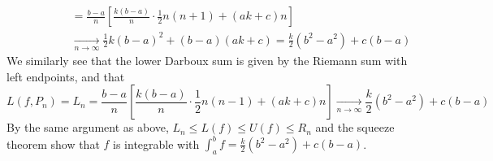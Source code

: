 \begin{examples}{}{}
\begin{enumerate}
	\begin{align*}
	\phantom{U(f,P_n)}&=\frac{b-a}n\left[\frac{k(b-a)}n\cdot \frac 12n(n+1)+(ak+c)n\right]\\
	&\xrightarrow[n\to\infty]{} \frac 12k(b-a)^2+(b-a)(ak+c)=\frac k2(b^2-a^2)+c(b-a)
	\end{align*}
	We similarly see that the lower Darboux sum is given by the Riemann sum with left endpoints, and that 
	\[L(f,P_n)=L_n= \frac{b-a}n\left[\frac{k(b-a)}n\cdot \frac 12n(n-1)+(ak+c)n\right] \xrightarrow[n\to\infty]{} \frac k2(b^2-a^2)+c(b-a)
	\]
	By the same argument as above, $L_n\le L(f)\le U(f)\le R_n$ and the squeeze theorem show that $f$ is integrable with $\int_a^bf=\frac k2(b^2-a^2)+c(b-a)$. 
\end{enumerate}
\end{examples}

\goodbreak


